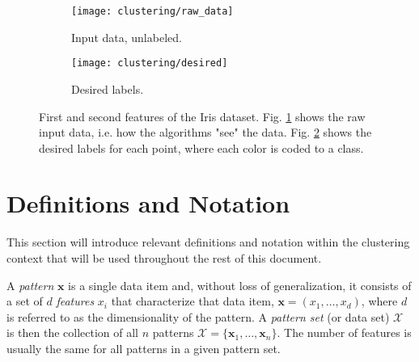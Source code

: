 \begin{figure}[!ht]
    \centering
    \begin{subfigure}[b]{0.45\textwidth}
        \centering
        \texttt{[image: clustering/raw\_data]}
        \caption{Input data, unlabeled.}
        \label{fig:intro raw}
    \end{subfigure}
    \begin{subfigure}[b]{0.45\textwidth}
        \centering
        \texttt{[image: clustering/desired]}
        \caption{Desired labels.}
        \label{fig:intro natural}
    \end{subfigure}

    \caption{First and second features of the Iris dataset. Fig. \ref{fig:intro raw} shows the raw input data, i.e. how the algorithms "see" the data. Fig. \ref{fig:intro natural} shows the desired labels for each point, where each color is coded to a class.}
    \label{fig:clustering plots}
\end{figure}


\section{Definitions and Notation}

This section will introduce relevant definitions and notation within the clustering context that will be used throughout the rest of this document.

A \emph{pattern} $\mathbf{x}$ is a single data item and, without loss of generalization, it consists of a set of $d$ \emph{features} $x_i$ that characterize that data item, $\mathbf{x} = (x_1, \ldots, x_d)$, where $d$ is referred to as the dimensionality of the pattern.
A \emph{pattern set} (or data set) $\mathcal{X}$ is then the collection of all $n$ patterns $\mathcal{X} = \{ \mathbf{x}_1, \ldots, \mathbf{x}_n \}$.
The number of features is usually the same for all patterns in a given pattern set.

